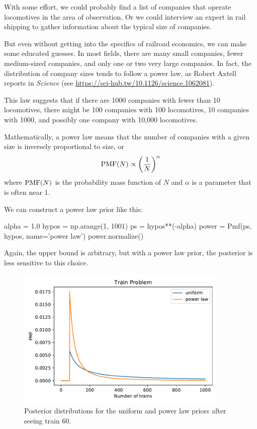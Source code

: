 \documentclass[12pt]{book}
\theoremstyle{exercise}
\begin{document}
With some effort, we could probably find a list of companies that
operate locomotives in the area of observation.
Or we could interview an expert in rail shipping to gather information about the typical size of companies.

But even without getting into the specifics of railroad economics, we
can make some educated guesses.  
In most fields, there are many small
companies, fewer medium-sized companies, and only one or two very
large companies.  
In fact, the distribution of company sizes tends to
follow a power law, as Robert Axtell reports in {\it Science} (see
\url{https://sci-hub.tw/10.1126/science.1062081}).



This law suggests that if there are 1000 companies with fewer than
10 locomotives, there might be 100 companies with 100 locomotives,
10 companies with 1000, and possibly one company with 10,000 locomotives.

Mathematically, a power law means that the number of companies
with a given size is inversely proportional to size, or
%
\[ \mathrm{PMF}(N) \propto \left( \frac{1}{N} \right)^{\alpha}   \]
%
where $\mathrm{PMF}(N)$ is the probability mass function of $N$ and $\alpha$ is
a parameter that is often near 1.

We can construct a power law prior like this:

\begin{code}
alpha = 1.0
hypos = np.arange(1, 1001)
ps = hypos**(-alpha)
power = Pmf(ps, hypos, name='power law')
power.normalize()
\end{code}

Again, the upper bound is arbitrary, but with a power law prior, the posterior is less sensitive to this choice.

\begin{figure}
\centerline{\includegraphics[width=4in]{figs/fig04-02.pdf}}
\caption{Posterior distributions for the uniform and power law priors
after seeing train 60.}
\label{fig04-02}
\end{figure}
\end{document}
